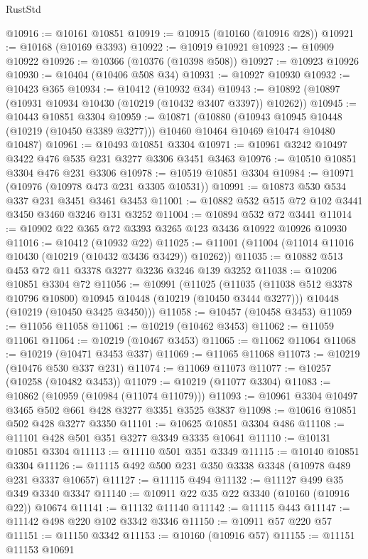 \begin{lexlean}{RustStd}
\begin{coremodule}
@10916 := @10161 @10851
@10919 := @10915 (@10160 (@10916 @28))
@10921 := @10168 (@10169 @3393)
@10922 := @10919 @10921
@10923 := @10909 @10922
@10926 := @10366 (@10376 (@10398 @508))
@10927 := @10923 @10926
@10930 := @10404 (@10406 @508 @34)
@10931 := @10927 @10930
@10932 := @10423 @365
@10934 := @10412 (@10932 @34)
@10943 := @10892 (@10897 (@10931 @10934 @10430 (@10219 (@10432 @3407 @3397)) @10262))
@10945 := @10443 @10851 @3304
@10959 := @10871
    (@10880
      (@10943 @10945 @10448 (@10219 (@10450 @3389 @3277)))
      @10460
      @10464
      @10469
      @10474
      @10480
      @10487)
@10961 := @10493 @10851 @3304
@10971 := @10961 @3242 @10497 @3422 @476 @535 @231 @3277 @3306 @3451 @3463
@10976 := @10510 @10851 @3304 @476 @231 @3306
@10978 := @10519 @10851 @3304
@10984 := @10971 (@10976 (@10978 @473 @231 @3305 @10531))
@10991 := @10873 @530 @534 @337 @231 @3451 @3461 @3453
@11001 := @10882 @532 @515 @72 @102 @3441 @3450 @3460 @3246 @131 @3252
@11004 := @10894 @532 @72 @3441
@11014 := @10902 @22 @365 @72 @3393 @3265 @123 @3436 @10922 @10926 @10930
@11016 := @10412 (@10932 @22)
@11025 := @11001 (@11004 (@11014 @11016 @10430 (@10219 (@10432 @3436 @3429)) @10262))
@11035 := @10882 @513 @453 @72 @11 @3378 @3277 @3236 @3246 @139 @3252
@11038 := @10206 @10851 @3304 @72
@11056 := @10991
    (@11025
      (@11035 (@11038 @512 @3378 @10796 @10800) @10945 @10448 (@10219 (@10450 @3444 @3277)))
      @10448
      (@10219 (@10450 @3425 @3450)))
@11058 := @10457 (@10458 @3453)
@11059 := @11056 @11058
@11061 := @10219 (@10462 @3453)
@11062 := @11059 @11061
@11064 := @10219 (@10467 @3453)
@11065 := @11062 @11064
@11068 := @10219 (@10471 @3453 @337)
@11069 := @11065 @11068
@11073 := @10219 (@10476 @530 @337 @231)
@11074 := @11069 @11073
@11077 := @10257 (@10258 (@10482 @3453))
@11079 := @10219 (@11077 @3304)
@11083 := @10862 (@10959 (@10984 (@11074 @11079)))
@11093 := @10961 @3304 @10497 @3465 @502 @661 @428 @3277 @3351 @3525 @3837
@11098 := @10616 @10851 @502 @428 @3277 @3350
@11101 := @10625 @10851 @3304 @486
@11108 := @11101 @428 @501 @351 @3277 @3349 @3335 @10641
@11110 := @10131 @10851 @3304
@11113 := @11110 @501 @351 @3349
@11115 := @10140 @10851 @3304
@11126 := @11115 @492 @500 @231 @350 @3338 @3348 (@10978 @489 @231 @3337 @10657)
@11127 := @11115 @494
@11132 := @11127 @499 @35 @349 @3340 @3347
@11140 := @10911 @22 @35 @22 @3340 (@10160 (@10916 @22)) @10674
@11141 := @11132 @11140
@11142 := @11115 @443
@11147 := @11142 @498 @220 @102 @3342 @3346
@11150 := @10911 @57 @220 @57
@11151 := @11150 @3342
@11153 := @10160 (@10916 @57)
@11155 := @11151 @11153 @10691

\end{coremodule}
\end{lexlean}
